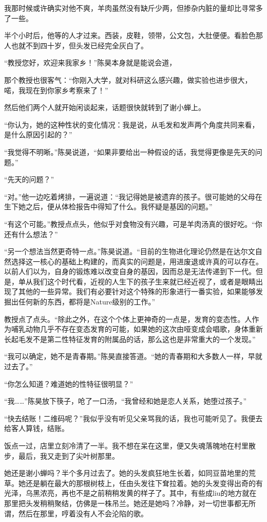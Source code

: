 \documentclass[lang=cn]{elegantpaper}
\begin{document}
我那时候或许确实对他不爽，羊肉虽然没有缺斤少两，但掺杂内脏的量却比寻常多了一些。

半个小时后，他等的人才过来。西装，皮鞋，领带，公文包，大肚便便。看脸色那人也就不到四十岁，但头发已经完全灰白了。

“教授您好，欢迎来我家乡！”陈昊本身就是能说会道，

那个教授也很客气：“你刚入大学，就对科研这么感兴趣，做实验也进步很大，喏，我现在到你家乡考察来了！”

然后他们两个人就开始闲谈起来，话题很快就转到了谢小蝉上。

“你认为，她的这种性状的变化情况：我是说，从毛发和发声两个角度共同来看，是什么原因引起的？”

“我觉得不明晰。”陈昊说道，“如果非要给出一种假设的话，我觉得更像是先天的问题。”

“先天的问题？”

“对。”他一边吃着烤排，一遍说道：“我记得她是被遗弃的孩子。很可能她的父母在生下她之后，便从体检报告中得知了什么。我怀疑是基因的问题。”

“有这个可能。”教授点点头，他似乎对食物没有兴趣，可是羊肉汤真的很好吃。“你还有什么想法？”

“另一个想法当然更奇特一点。”陈昊说道。“目前的生物进化理论仍然是在达尔文自然选择这一核心的基础上构建的，而真实的问题是，用进废退或许真的可以存在。以前人们以为，自身的锻炼难以改变自身的基因，因而总是无法传递到下一代。但是，单从我们这个时代看，近视的人生下的孩子生来就已经近视了，或者是眼睛出现了其他的一些异常。我们有必要针对这个特殊的形象进行一番实验，如果能够发掘出任何新的东西，都将是Nature级别的工作。”

教授点了点头。“除此之外，在这个个体上更神奇的一点是，发育的变态性。人作为哺乳动物几乎不存在变态发育的可能，如果她的这次由哑变成会唱歌，身体重新长起毛发不是第二性特征发育的附属品的话，那么这也是非常重大的一个发现。”

“我可以确定，她不是青春期。”陈昊直接答道。“她的青春期和大多数人一样，早就过去了。”

“你怎么知道？难道她的性特征很明显？”

“我……”陈昊放下筷子，呛了一口汤，“我曾经和她是恋人关系，她堕过孩子。”

“快去结账！二维码呢？”我似乎没有听见父亲骂我的话，我也可能听见了。我便去给客人算钱，结账。

饭点一过，店里立刻冷清了一半。我不想在呆在这里，便又失魂落魄地在村里散步，最后，我又走到了尖叶树那里。

她还是谢小蝉吗？半个多月过去了。她的头发疯狂地生长着，如同豆苗地里的荒草。她还是躺在最大的那根树枝上，任由头发往下耷拉着。她的头发变得出奇的有光泽，乌黑浓亮，再也不是之前稍稍发黄的样子了。其中，有些成liu的地方就在那里把头发稍稍聚结，仿佛是一株吊兰。她还是她吗？冷静，对一切世事都无所谓，然后在那里，哼着没有人不会沦陷的歌。
\end{document}
